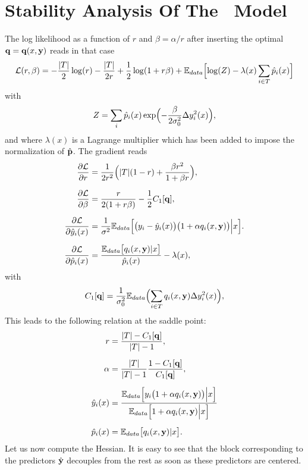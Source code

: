 \chapter{Stability Analysis Of The \XX \ Model}\label{app:Hessian}
The log likelihood as a function of $r$ and $\beta=\alpha/r$ after inserting the optimal
${\bf q} = {\bf q}(x,{\bf y})$ reads in that case
\[
{\cal L}(r,\beta) = -\frac{\vert T\vert}{2}\log(r)-\frac{\vert T\vert}{2r}+\frac{1}{2}\log(1+r\beta)+{\mathbb E}_{data}\Bigl[\log(Z)-\lambda(x)\sum_{i\in T} \hat p_i(x)\Bigr]
\]
with
\[
Z = \sum_i \hat p_i(x)\exp\Bigl(-\frac{\beta}{2\sigma_0^2}\Delta y_i^2(x)\Bigr),
\]
and where $\lambda(x)$ is a Lagrange multiplier which has been added to impose the normalization of $\hat {\bf p}$.
The gradient reads
\begin{align*}
  \frac{\partial {\cal L}}{\partial r} &= \frac{1}{2r^2}\Bigl(\vert T\vert(1-r)+\frac{\beta r^2}{1+\beta r}\Bigr),\\[0.2cm]
  \frac{\partial {\cal L}}{\partial \beta} &= \frac{r}{2(1+r\beta)}-\frac{1}{2}C_1[{\bf q}],\\[0.2cm]
  \frac{\partial{\cal L}}{\partial \hat y_i(x)} &= \frac{1}{\sigma^2}{\mathbb E}_{data}\Bigl[ \bigl(y_i-\hat y_i(x)\bigr)\bigl(1+\alpha q_i(x,{\bf y})\bigr)\Big\vert x\Bigr].\\[0.2cm]
  \frac{\partial {\cal L}}{\partial \hat p_i(x)} &= \frac{{\mathbb E}_{data}\bigl[ q_i(x,{\bf y})\vert x \bigr]}{\hat p_i(x)}-\lambda(x),
\end{align*}
with
\[
C_1[{\bf q}] = \frac{1}{\sigma_0^2}{\mathbb E}_{data}\Bigl(\sum_{i\in T} q_i(x,{\bf y})\Delta y_i^2(x)\Bigr),
\]
This leads to the following relation at the saddle point:
\begin{align*}
  r &= \frac{\vert T\vert-C_1[{\bf q}]}{\vert T\vert-1},\\[0.2cm]
  \alpha &= \frac{\vert T\vert}{\vert T\vert-1}\frac{1-C_1[{\bf q}]}{C_1[{\bf q}]},\\[0.2cm]
\hat y_i(x) &= \frac{{\mathbb E}_{data}\Bigl[y_i\bigl(1+\alpha q_i(x,{\bf y})\bigr)\Big\vert x\Bigr]}
{{\mathbb E}_{data}\Bigl[1+\alpha q_i(x,{\bf y})\Big\vert x\Bigr]}\\[0.2cm]
  \hat p_i(x) &= \mathbb{E}_{data}\bigl[ q_i(x,{\bf y})\vert x \bigr].
\end{align*}
Let us now compute the Hessian. It is easy to see that the block corresponding to the predictors $\hat{\bf y}$ decouples from the rest as soon as these predictors are centered. 

